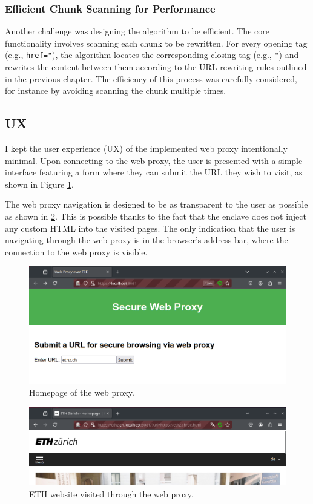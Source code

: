 \subsubsection{Efficient Chunk Scanning for Performance}
Another challenge was designing the algorithm to be efficient. The core functionality involves scanning each chunk to be rewritten. For every opening tag (e.g., \texttt{href="}), the algorithm locates the corresponding closing tag (e.g., \texttt{"}) and rewrites the content between them according to the URL rewriting rules outlined in the previous chapter. The efficiency of this process was carefully considered, for instance by avoiding scanning the chunk multiple times.

\subsection{UX}
I kept the user experience (UX) of the implemented web proxy intentionally minimal. Upon connecting to the web proxy, the user is presented with a simple interface featuring a form where they can submit the URL they wish to visit, as shown in Figure \ref{fig:homepage}.

The web proxy navigation is designed to be as transparent to the user as possible as shown in \ref{fig:website-navigation}. This is possible thanks to the fact that the enclave does not inject any custom HTML into the visited pages. The only indication that the user is navigating through the web proxy is in the browser's address bar, where the connection to the web proxy is visible.

\begin{figure}[h!]
    \centering
    \includegraphics[width=1\linewidth]{media/homepage.png}
    \caption{Homepage of the web proxy.}
    \label{fig:homepage}
\end{figure}

\begin{figure}[h!]
    \centering
    \includegraphics[width=1\linewidth]{media/website-navigation.png}
    \caption{ETH website visited through the web proxy.}
    \label{fig:website-navigation}
\end{figure}

